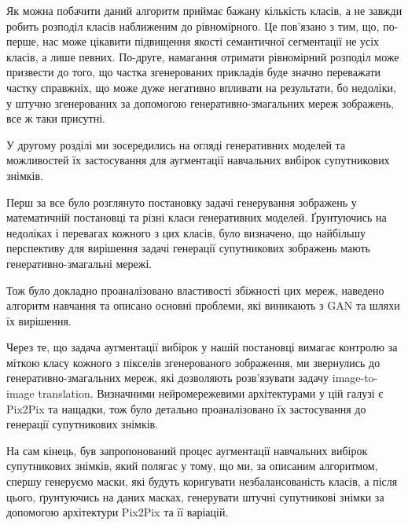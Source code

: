 Як можна побачити даний алгоритм приймає бажану кількість класів,
а не завжди робить розподіл класів наближеним до рівномірного.
Це пов'язано з тим,  що, по-перше, нас може цікавити підвищення якості
семантичної сегментації не усіх класів, а лише певних.
По-друге, намагання отримати рівномірний розподіл може призвести до того,
що частка згенерованих прикладів буде значно переважати частку
справжніх, що може дуже негативно впливати на результати, бо
недоліки, у штучно згенерованих за допомогою генеративно-змагальних
мереж зображень, все ж таки присутні.

\chapconclude{\ref{chap:gans}}

У другому розділі ми зосередились на огляді
генеративних моделей та можливостей їх
застосування для аугментації навчальних вибірок
супутникових знімків.

Перш за все було розглянуто постановку задачі
генерування зображень у математичній постановці та
різні класи генеративних моделей. Ґрунтуючись на недоліках і
перевагах кожного з цих класів, було визначено,
що найбільшу перспективу для вирішення задачі генерації
супутникових зображень мають генеративно-змагальні мережі.

Тож було докладно проаналізовано властивості збіжності цих мереж,
наведено алгоритм навчання та описано основні проблеми, які
виникають з GAN та шляхи їх вирішення.

Через те, що задача аугментації вибірок у нашій постановці вимагає
контролю за міткою класу кожного з пікселів згенерованого зображення,
ми звернулись до генеративно-змагальних мереж, які дозволяють
розв'язувати задачу image-to-image translation. Визначними нейромережевими
архітектурами у цій галузі є Pix2Pix та нащадки, тож було
детально проаналізовано їх застосування до
генерації супутникових знімків.

На сам кінець, був запропонований процес аугментації навчальних вибірок супутникових
знімків, який полягає у тому, що ми, за описаним алгоритмом, спершу
генеруємо маски, які будуть коригувати незбалансованість класів,
а після цього, ґрунтуючись на даних масках, генерувати штучні
супутникові знімки за допомогою
архітектури Pix2Pix та її варіацій.